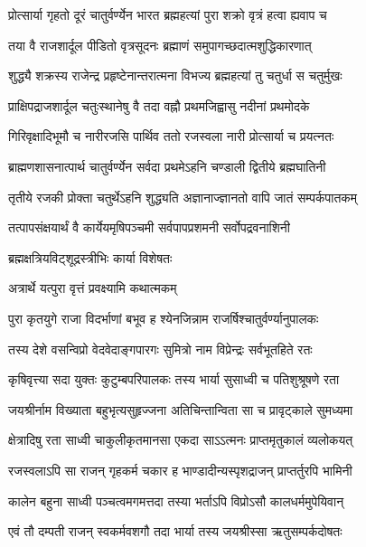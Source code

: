 \twolineshloka
{प्रोत्सार्या गृहतो दूरं चातुर्वर्ण्येन भारत}
{ब्रह्महत्यां पुरा शक्रो वृत्रं हत्वा ह्यवाप च} %

\twolineshloka
{तया वै राजशार्दूल पीडितो वृत्रसूदनः}
{ब्रह्माणं समुपागच्छदात्मशुद्धिकारणात्} %

\twolineshloka
{शुद्ध्यै शक्रस्य राजेन्द्र प्रहृष्टेनान्तरात्मना}
{विभज्य ब्रह्महत्यां तु चतुर्धा स चतुर्मुखः} %

\twolineshloka
{प्राक्षिपद्राजशार्दूल चतुःस्थानेषु वै तदा}
{वह्नौ प्रथमजिह्वासु नदीनां प्रथमोदके} %

\twolineshloka
{गिरिवृक्षादिभूमौ च नारीरजसि पार्थिव}
{ततो रजस्वला नारी प्रोत्सार्या च प्रयत्नतः} %

\twolineshloka
{ब्राह्मणशासनात्पार्थ चातुर्वर्ण्येन सर्वदा}
{प्रथमेऽहनि चण्डाली द्वितीये ब्रह्मघातिनी} %

\twolineshloka
{तृतीये रजकी प्रोक्ता चतुर्थेऽहनि शुद्ध्यति}
{अज्ञानाज्ज्ञानतो वापि जातं सम्पर्कपातकम्} %

\twolineshloka
{तत्पापसंक्षयार्थं वै कार्येयमृषिपञ्चमी}
{सर्वपापप्रशमनी सर्वोपद्रवनाशिनी} %

\onelineshloka
{ब्रह्मक्षत्रियविट्शूद्रस्त्रीभिः कार्या विशेषतः} %


\onelineshloka
{अत्रार्थे यत्पुरा वृत्तं प्रवक्ष्यामि कथात्मकम्} %

\twolineshloka
{पुरा कृतयुगे राजा विदर्भाणां बभूव ह}
{श्येनजिन्नाम राजर्षिश्चातुर्वर्ण्यानुपालकः} %

\twolineshloka
{तस्य देशे वसन्विप्रो वेदवेदाङ्गपारगः}
{सुमित्रो नाम विप्रेन्द्रः सर्वभूतहिते रतः} %

\twolineshloka
{कृषिवृत्त्या सदा युक्तः कुटुम्बपरिपालकः}
{तस्य भार्या सुसाध्वी च पतिशुश्रूषणे रता} %

\twolineshloka
{जयश्रीर्नाम विख्याता बहुभृत्यसुहृज्जना}
{अतिचिन्तान्विता सा च प्रावृट्काले सुमध्यमा} %

\twolineshloka
{क्षेत्रादिषु रता साध्वी चाकुलीकृतमानसा}
{एकदा साऽऽत्मनः प्राप्तमृतुकालं व्यलोकयत्} %

\twolineshloka
{रजस्वलाऽपि सा राजन् गृहकर्म चकार ह}
{भाण्डादीन्यस्पृशद्राजन् प्राप्तर्तुरपि भामिनी} %

\twolineshloka
{कालेन बहुना साध्वी पञ्चत्वमगमत्तदा}
{तस्या भर्ताऽपि विप्रोऽसौ कालधर्ममुपेयिवान्} %

\twolineshloka
{एवं तौ दम्पती राजन् स्वकर्मवशगौ तदा}
{भार्या तस्य जयश्रीस्सा ऋतुसम्पर्कदोषतः} %

